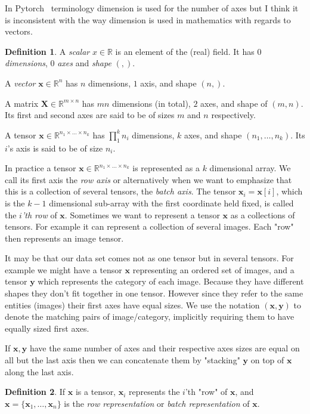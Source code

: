 \documentclass[11pt, a4paper]{report}
\theoremstyle{plain}
\theoremstyle{definition}
\newtheorem{mydef}{Definition}[chapter]
\theoremstyle{remark}
\newcommand{\R}{\mathbb{R}}
\newcommand{\X}{\mathbf{X}}
\newcommand{\x}{\mathbf{x}}
\newcommand{\y}{\mathbf{y}}
\begin{document}
In Pytorch~\cite{pytorch2018pytorch} terminology dimension is used for the
number of axes but I think it is inconsistent with the way dimension is used in
mathematics with regards to vectors.

\begin{mydef}
\label{def:tensor}
A \emph{scalar} $x \in \R$ is an element of the (real) field. It has $0$
\emph{dimensions}, $0$ \emph{axes} and \emph{shape} $(,)$.

A \emph{vector} $\x \in \R^n$ has $n$ dimensions, $1$ axis, and shape $(n,)$.

A matrix $\X \in \R^{m \times n}$ has $mn$ dimensions (in total), $2$ axes, and
shape of $(m,n)$. Its first and second axes are said to be of sizes $m$ and $n$
respectively.

A tensor $\x \in \R^{n_1 \times \dots \times n_k}$ has $\prod_1^k n_i$
dimensions, $k$ axes, and shape $(n_1, \dots, n_k)$. Its $i$'s axis is said to
be of size $n_i$.
\end{mydef}

In practice a tensor $\x \in \R^{n_1 \times \dots \times n_k}$ is represented as
a $k$ dimensional array. We call its first axis the \emph{row axis} or
alternatively when we want to emphasize that this is a collection of several
tensors, the \emph{batch axis}. The tensor $\x_i = \x[i]$, which is the $k-1$
dimensional sub-array with the first coordinate held fixed, is called the
\emph{$i$'th row} of $\x$. Sometimes we want to represent a tensor $\x$ as a
collections of tensors. For example it can represent a collection of several
images. Each "row" then represents an image tensor.

It may be that our data set comes not as one tensor but in several tensors. For
example we might have a tensor $\x$ representing an ordered set of images, and a
tensor $\y$ which represents the category of each image. Because they have
different shapes they don't fit together in one tensor. However since they refer
to the same entities (images) their first axes have equal sizes. We use the
notation $(\x, \y)$ to denote the matching pairs of image/category, implicitly
requiring them to have equally sized first axes.

If $\x,\y$ have the same number of axes and their respective axes sizes are
equal on all but the last axis then we can concatenate them by "stacking" $\y$
on top of $\x$ along the last axis.

\begin{mydef}
\label{def:rowrep}
If $\x$ is a tensor, $\x_i$ represents the $i$'th "row" of $\x$,
and $\x = \{\x_1, \dots , \x_n\}$ is the \emph{row representation} or 
\emph{batch
representation} of $\x$.
\end{mydef}
\end{document}
